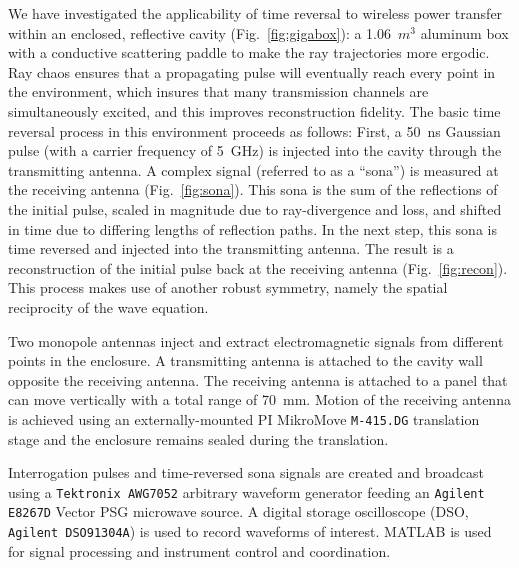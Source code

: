 We have investigated the applicability of time reversal to wireless power
transfer within an enclosed, reflective cavity (Fig.~\ref{fig:gigabox}): a
1.06~$m^3$ aluminum box with a conductive scattering paddle to make the ray
trajectories more ergodic.
%
Ray chaos ensures that a propagating pulse will eventually reach every point in
the environment, which insures that many transmission channels are
simultaneously excited, and this improves reconstruction fidelity.
%
The basic time reversal process in this environment proceeds as follows: First,
a 50~ns Gaussian pulse (with a carrier frequency of 5~GHz) is injected into
the cavity through the transmitting antenna.
%
A complex signal (referred to as a ``sona'') is measured at the receiving
antenna (Fig.~\ref{fig:sona}).
%
This sona is the sum of the reflections of the initial pulse, scaled in
magnitude due to ray-divergence and loss, and shifted in time due to differing
lengths of reflection paths.
%
In the next step, this sona is time reversed and injected into the transmitting
antenna.
%
The result is a reconstruction of the initial pulse back at the receiving
antenna (Fig.~\ref{fig:recon}).
%
This process makes use of another robust symmetry, namely the spatial
reciprocity of the wave equation.



Two monopole antennas inject and extract electromagnetic signals from different
points in the enclosure. A transmitting antenna is attached to the cavity wall
opposite the receiving antenna.
%
The receiving antenna is attached to a panel that can move vertically with a
total range of 70~mm.
%
Motion of the receiving antenna is achieved using an externally-mounted PI
MikroMove \texttt{M-415.DG} translation stage and the enclosure remains sealed
during the translation.



Interrogation pulses and time-reversed sona signals are created and broadcast
using a \texttt{Tektronix AWG7052} arbitrary waveform generator feeding an
\texttt{Agilent E8267D} Vector PSG microwave source.
%
A digital storage oscilloscope (DSO, \texttt{Agilent DSO91304A}) is used to
record waveforms of interest. MATLAB is used for signal processing and
instrument control and coordination.
